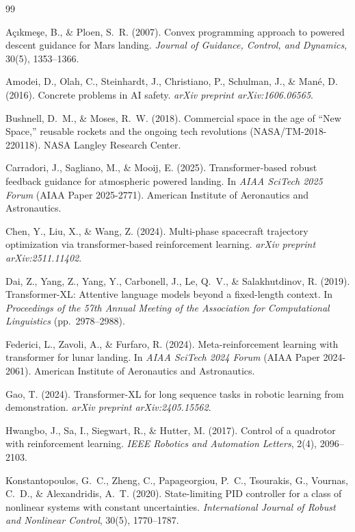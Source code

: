 \documentclass[10pt,twocolumn]{article}
\begin{document}
\begin{thebibliography}{99}

A\c{c}\i kme\c{s}e, B., \& Ploen, S.~R. (2007).
Convex programming approach to powered descent guidance for Mars landing.
\textit{Journal of Guidance, Control, and Dynamics}, 30(5), 1353--1366.

Amodei, D., Olah, C., Steinhardt, J., Christiano, P., Schulman, J., \& Man\'{e}, D. (2016).
Concrete problems in AI safety.
\textit{arXiv preprint arXiv:1606.06565}.

Bushnell, D.~M., \& Moses, R.~W. (2018).
Commercial space in the age of ``New Space,'' reusable rockets and the ongoing tech revolutions (NASA/TM-2018-220118).
NASA Langley Research Center.

Carradori, J., Sagliano, M., \& Mooij, E. (2025).
Transformer-based robust feedback guidance for atmospheric powered landing.
In \textit{AIAA SciTech 2025 Forum} (AIAA Paper 2025-2771).
American Institute of Aeronautics and Astronautics.

Chen, Y., Liu, X., \& Wang, Z. (2024).
Multi-phase spacecraft trajectory optimization via transformer-based reinforcement learning.
\textit{arXiv preprint arXiv:2511.11402}.

Dai, Z., Yang, Z., Yang, Y., Carbonell, J., Le, Q.~V., \& Salakhutdinov, R. (2019).
Transformer-XL: Attentive language models beyond a fixed-length context.
In \textit{Proceedings of the 57th Annual Meeting of the Association for Computational Linguistics} (pp.~2978--2988).

Federici, L., Zavoli, A., \& Furfaro, R. (2024).
Meta-reinforcement learning with transformer for lunar landing.
In \textit{AIAA SciTech 2024 Forum} (AIAA Paper 2024-2061).
American Institute of Aeronautics and Astronautics.

Gao, T. (2024).
Transformer-XL for long sequence tasks in robotic learning from demonstration.
\textit{arXiv preprint arXiv:2405.15562}.

Hwangbo, J., Sa, I., Siegwart, R., \& Hutter, M. (2017).
Control of a quadrotor with reinforcement learning.
\textit{IEEE Robotics and Automation Letters}, 2(4), 2096--2103.

Konstantopoulos, G.~C., Zheng, C., Papageorgiou, P.~C., Tsourakis, G., Vournas, C.~D., \& Alexandridis, A.~T. (2020).
State-limiting PID controller for a class of nonlinear systems with constant uncertainties.
\textit{International Journal of Robust and Nonlinear Control}, 30(5), 1770--1787.


\end{thebibliography}
\end{document}

